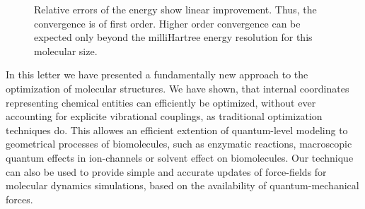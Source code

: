 \documentclass[prl,aps,twocolumn,showpacs,twocolumngrid,superbib]{revtex4}
\begin{document}
\begin{figure}[h]
\caption{
\small  
Relative errors of the energy show linear improvement.
Thus, the convergence is of first order. Higher order
convergence can be expected only beyond the milliHartree
energy resolution for this molecular size.
\label{order-of-conv}
}
\end{figure}

In this letter we have presented a fundamentally new approach
to the optimization of molecular structures.
We have shown, that internal coordinates representing chemical 
entities can efficiently be optimized, without
ever accounting for explicite vibrational couplings, as traditional
optimization techniques do. This allowes an efficient
extention of quantum-level modeling to geometrical processes
of biomolecules, such as enzymatic reactions, macroscopic quantum 
effects in ion-channels or solvent effect on biomolecules.
Our technique can also be used
to provide simple and accurate updates of force-fields
for molecular dynamics simulations, based on the availability of
quantum-mechanical forces.


\end{document}
